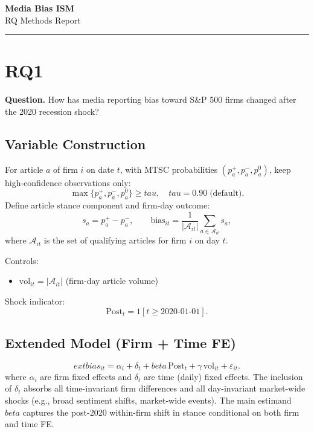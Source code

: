 \documentclass[11pt]{article}
\def\beta{beta}%
\def\tau{tau}%
\def\mathbb#1{#1}%
\begin{document}
\begin{center}
{\LARGE \textbf{Media Bias ISM}}\\
\vspace{0.15em}
{\normalsize RQ Methods Report}\\
\end{center}
\vspace{0.2em}
\hrule
\vspace{0.5em}
\small

\section*{RQ1}
\textbf{Question.} How has media reporting bias toward S\&P 500 firms changed after the 2020 recession shock?

\subsection*{Variable Construction}
For article $a$ of firm $i$ on date $t$, with MTSC probabilities $(p_a^+, p_a^-, p_a^0)$, keep high-confidence observations only:
\[
\max\{p_a^+, p_a^-, p_a^0\} \ge \tau,\quad \tau=0.90\;\text{(default)}.
\]
Define article stance component and firm-day outcome:
\[
s_a = p_a^+ - p_a^-,
\qquad
\text{bias}_{it} = \frac{1}{|\mathcal{A}_{it}|}\sum_{a\in\mathcal{A}_{it}} s_a,
\]
where $\mathcal{A}_{it}$ is the set of qualifying articles for firm $i$ on day $t$.

Controls:
\begin{itemize}[leftmargin=1.5em]
\item $\text{vol}_{it}=|\mathcal{A}_{it}|$ (firm-day article volume)
\end{itemize}

Shock indicator:
\[
\text{Post}_t = \mathbb{1}[t\ge\text{2020-01-01}].
\]

\subsection*{Extended Model (Firm + Time FE)}
\[
	ext{bias}_{it} = \alpha_i + \delta_t + \beta\,\text{Post}_t + \gamma\,\text{vol}_{it} + \varepsilon_{it}.
\]
where $\alpha_i$ are firm fixed effects and $\delta_t$ are time (daily) fixed effects. The inclusion of $\delta_t$ absorbs all time-invariant firm differences and all day-invariant market-wide shocks (e.g., broad sentiment shifts, market-wide events). The main estimand $\beta$ captures the post-2020 within-firm shift in stance conditional on both firm and time FE.
\end{document}
